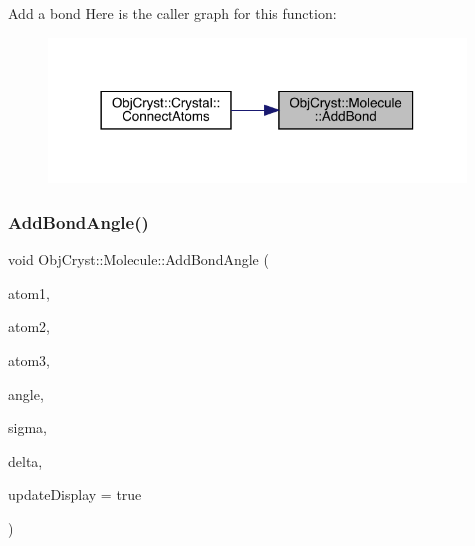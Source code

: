 Add a bond Here is the caller graph for this function\+:
\nopagebreak
\begin{figure}[H]
\begin{center}
\leavevmode
\includegraphics[width=314pt]{class_obj_cryst_1_1_molecule_aa37feb3abde7ca0ff6453b97d910800f_icgraph}
\end{center}
\end{figure}
\mbox{\label{class_obj_cryst_1_1_molecule_a25132c259da4d0bd739ff0ffc008575e}} 
\subsubsection{\texorpdfstring{AddBondAngle()}{AddBondAngle()}}
{\footnotesize\ttfamily void Obj\+Cryst\+::\+Molecule\+::\+Add\+Bond\+Angle (\begin{DoxyParamCaption}\item[{\mbox{\hyperlink{class_obj_cryst_1_1_mol_atom}{Mol\+Atom}} \&}]{atom1,  }\item[{\mbox{\hyperlink{class_obj_cryst_1_1_mol_atom}{Mol\+Atom}} \&}]{atom2,  }\item[{\mbox{\hyperlink{class_obj_cryst_1_1_mol_atom}{Mol\+Atom}} \&}]{atom3,  }\item[{const R\+E\+AL}]{angle,  }\item[{const R\+E\+AL}]{sigma,  }\item[{const R\+E\+AL}]{delta,  }\item[{const bool}]{update\+Display = {\ttfamily true} }\end{DoxyParamCaption})}

